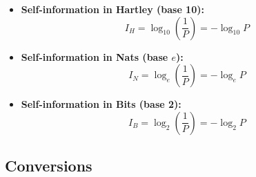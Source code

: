 \documentclass[11pt,a4paper]{book}
\begin{document}
\begin{itemize}
    \item \textbf{Self-information in Hartley (base 10):}
          \[
              I_H = \log_{10}\!\left(\frac{1}{P}\right) = -\log_{10} P
          \]

    \item \textbf{Self-information in Nats (base \(e\)):}
          \[
              I_N = \log_{e}\!\left(\frac{1}{P}\right) = -\log_{e} P
          \]

    \item \textbf{Self-information in Bits (base 2):}
          \[
              I_B = \log_{2}\!\left(\frac{1}{P}\right) = -\log_{2} P
          \]
\end{itemize}

\subsection{Conversions}
\end{document}
